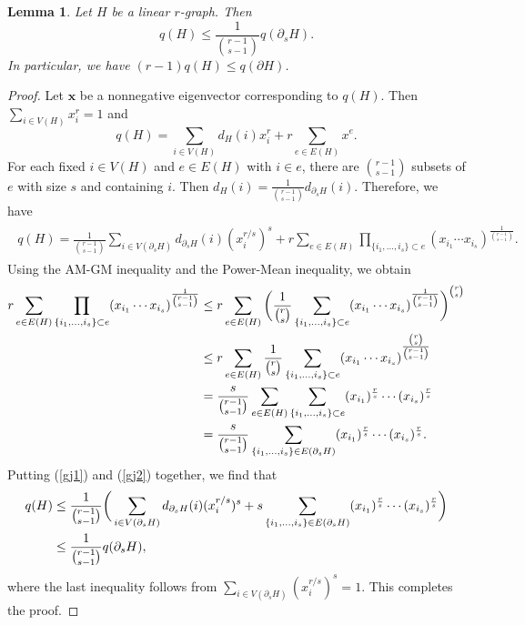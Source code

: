 \documentclass[11pt,a4paper]{article}
\theoremstyle{plain}
\newtheorem{lem}[theorem]{Lemma}
\theoremstyle{definition}
\begin{document}
\begin{lem}\label{gj}
Let $H$ be a linear $r$-graph. Then
$$q(H)\leq\frac{1}{\binom{r-1}{s-1}}q(\partial_{s} H).$$
In particular, we have $(r-1)q(H)\leq q(\partial H)$.
\end{lem}

\begin{proof}
Let $\mathbf{x}$ be a nonnegative eigenvector corresponding to $q(H)$. 
Then  $\sum_{i\in V(H)} x_i^r =1$ and 
\[  q(H)=\sum_{i\in V(H)}d_{H}(i)x_{i}^{r}+r\sum_{e\in E(H)}x^{e}. \]
For each fixed $i\in V(H)$ and $e\in E(H)$ with $i\in e$, 
there are ${r-1 \choose s-1}$ subsets of $e$ with size $s$ and containing $i$. 
Then $d_H(i)= \frac{1}{{r-1 \choose s-1}}d_{\partial_s H}(i)$. Therefore, we have 
\begin{align}\label{gj1}
\begin{split}
q(H) = \frac{1}{\binom{r-1}{s-1}}\sum_{i\in V(\partial_{s}H)}d_{\partial_{s}H}(i)(x_{i}^{r/s})^{s}
+r\sum_{e\in E(H)}\prod_{\{i_{1},\ldots,i_{s}\}\subset e} 
(x_{i_{1}}\cdots x_{i_{s}})^{\frac{1}{\binom{r-1}{s-1}}}.
 \end{split}
\end{align} 
Using the AM-GM inequality and the Power-Mean inequality, we obtain 
\begin{align}
r\sum_{e\in E(H)}\prod_{\{i_{1},\ldots,i_{s}\}\subset e}(x_{i_{1}}\cdots x_{i_{s}})^{\frac{1}{\binom{r-1}{s-1}}}
&\leq  r\sum_{e\in E(H)}\bigg(\frac{1}{\binom{r}{s}}\sum_{\{i_{1},\ldots,i_{s}\}\subset e}(x_{i_{1}}\cdots x_{i_{s}})^{\frac{1}{\binom{r-1}{s-1}}}\bigg)^{\binom{r}{s}} \notag \\
&\leq  r\sum_{e\in E(H)} \frac{1}{\binom{r}{s}}\sum_{\{i_{1},\ldots,i_{s}\}\subset e}(x_{i_{1}}\cdots x_{i_{s}})^{\frac{\binom{r}{s}}{\binom{r-1}{s-1}}}  \notag \\
&= \frac{s}{\binom{r-1}{s-1}}\sum_{e\in E(H)} \sum_{\{i_{1},\ldots,i_{s}\}\subset e}(x_{i_{1}})^{\frac{r}{s}}\cdots(x_{i_{s}})^{\frac{r}{s}} \notag \\
&= \frac{s}{\binom{r-1}{s-1}} \sum_{\{i_{1},\ldots,i_{s}\}\in E(\partial_{s} H)}(x_{i_{1}})^{\frac{r}{s}}\cdots(x_{i_{s}})^{\frac{r}{s}}. \label{gj2}
\end{align}
Putting (\ref{gj1}) and (\ref{gj2}) together, we find that
\begin{align*} \notag
q(H)&\leq \frac{1}{\binom{r-1}{s-1}}\bigg(\sum_{i\in V(\partial_{s}H)}d_{\partial_{s}H}(i)(x_{i}^{r/s})^{s}+
s\sum_{\{i_{1},\ldots,i_{s}\}\in E(\partial_{s} H)}(x_{i_{1}})^{\frac{r}{s}}\cdots(x_{i_{s}})^{\frac{r}{s}}\bigg)\\ \notag 
&\leq \frac{1}{\binom{r-1}{s-1}}q(\partial_{s} H),
\end{align*}
where the last inequality follows from $\sum_{i\in V(\partial_{s} H)}(x_{i}^{r/s})^{s}=1$. 
This completes the proof. 
\end{proof}
\end{document}
